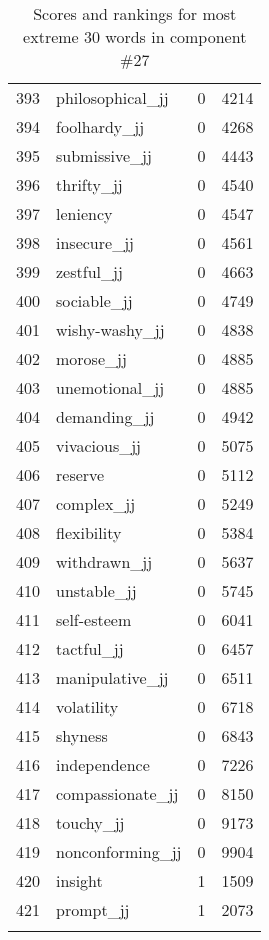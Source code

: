 \begin{longtable}[!htbp]{| rlr@{.}l |}
    393 & philosophical\_jj & 0 & 4214 \\
    394 & foolhardy\_jj & 0 & 4268 \\
    395 & submissive\_jj & 0 & 4443 \\
    396 & thrifty\_jj & 0 & 4540 \\
    397 & leniency & 0 & 4547 \\
    398 & insecure\_jj & 0 & 4561 \\
    399 & zestful\_jj & 0 & 4663 \\
    400 & sociable\_jj & 0 & 4749 \\
    401 & wishy-washy\_jj & 0 & 4838 \\
    402 & morose\_jj & 0 & 4885 \\
    403 & unemotional\_jj & 0 & 4885 \\
    404 & demanding\_jj & 0 & 4942 \\
    405 & vivacious\_jj & 0 & 5075 \\
    406 & reserve & 0 & 5112 \\
    407 & complex\_jj & 0 & 5249 \\
    408 & flexibility & 0 & 5384 \\
    409 & withdrawn\_jj & 0 & 5637 \\
    410 & unstable\_jj & 0 & 5745 \\
    411 & self-esteem & 0 & 6041 \\
    412 & tactful\_jj & 0 & 6457 \\
    413 & manipulative\_jj & 0 & 6511 \\
    414 & volatility & 0 & 6718 \\
    415 & shyness & 0 & 6843 \\
    416 & independence & 0 & 7226 \\
    417 & compassionate\_jj & 0 & 8150 \\
    418 & touchy\_jj & 0 & 9173 \\
    419 & nonconforming\_jj & 0 & 9904 \\
    420 & insight & 1 & 1509 \\
    421 & prompt\_jj & 1 & 2073 \\
    \hline
    \caption{Scores and rankings for most extreme 30 words in component \#27} \\
\end{longtable}

